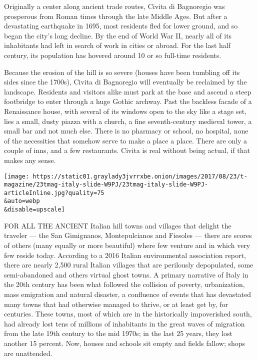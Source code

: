 Originally a center along ancient trade routes, Civita di Bagnoregio was
prosperous from Roman times through the late Middle Ages. But after a
devastating earthquake in 1695, most residents fled for lower ground,
and so began the city's long decline. By the end of World War II, nearly
all of its inhabitants had left in search of work in cities or abroad.
For the last half century, its population has hovered around 10 or so
full-time residents.

Because the erosion of the hill is so severe (houses have been tumbling
off its sides since the 1700s), Civita di Bagnoregio will eventually be
reclaimed by the landscape. Residents and visitors alike must park at
the base and ascend a steep footbridge to enter through a huge Gothic
archway. Past the backless facade of a Renaissance house, with several
of its windows open to the sky like a stage set, lies a small, dusty
piazza with a church, a fine seventh-century medieval tower, a small bar
and not much else. There is no pharmacy or school, no hospital, none of
the necessities that somehow serve to make a place a place. There are
only a couple of inns, and a few restaurants. Civita is real without
being actual, if that makes any sense.

\texttt{[image: https://static01.graylady3jvrrxbe.onion/images/2017/08/23/t-magazine/23tmag-italy-slide-W9PJ/23tmag-italy-slide-W9PJ-articleInline.jpg?quality=75\\\&auto=webp\\\&disable=upscale]}

FOR ALL THE ANCIENT Italian hill towns and villages that delight the
traveler --- the San Gimignanos, Montepulcianos and Fiesoles --- there
are scores of others (many equally or more beautiful) where few venture
and in which very few reside today. According to a 2016 Italian
environmental association report, there are nearly 2,500 rural Italian
villages that are perilously depopulated, some semi-abandoned and others
virtual ghost towns. A primary narrative of Italy in the 20th century
has been what followed the collision of poverty, urbanization, mass
emigration and natural disaster, a confluence of events that has
devastated many towns that had otherwise managed to thrive, or at least
get by, for centuries. These towns, most of which are in the
historically impoverished south, had already lost tens of millions of
inhabitants in the great waves of migration from the late 19th century
to the mid 1970s; in the last 25 years, they lost another 15 percent.
Now, houses and schools sit empty and fields fallow; shops are
unattended.

